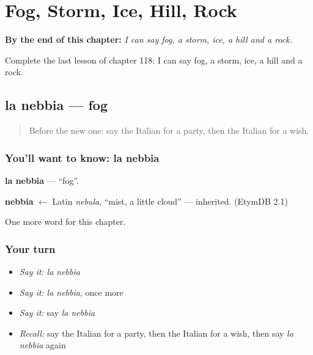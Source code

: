 
\chapter{Fog, Storm, Ice, Hill, Rock}
\label{ch:it-fog-storm-ice-hill-rock}

\begin{chapteropening}
\textbf{By the end of this chapter:} \emph{I can say fog, a storm, ice, a hill and a rock.}

Complete the last lesson of chapter 118: I can say fog, a storm, ice, a hill and a rock.
\end{chapteropening}

\section[la nebbia]{la nebbia — fog}

\label{lesson:IT-C118-nebbia}



\begin{quote}
Before the new one: say the Italian for a party, then the Italian for a wish.
\end{quote}

\subsection*{You'll want to know: la nebbia}
\textbf{la nebbia} — \textquotedblleft{}fog\textquotedblright{}.

\begin{cousinweb}
\textbf{nebbia} $\leftarrow$ Latin \emph{nebula}, \textquotedblleft{}mist, a little cloud\textquotedblright{} — inherited. (EtymDB 2.1)
\end{cousinweb}

\begin{grammarlens}[title={What you've built}]
One more word for this chapter.
\end{grammarlens}

\subsection*{Your turn}
\begin{itemize}
\raggedright
  \item \emph{Say it:} \emph{la nebbia}
  \item \emph{Say it:} \emph{la nebbia}, once more
  \item \emph{Say it:} say \emph{la nebbia}
  \item \emph{Recall:} say the Italian for a party, then the Italian for a wish, then say \emph{la nebbia} again
\end{itemize}

